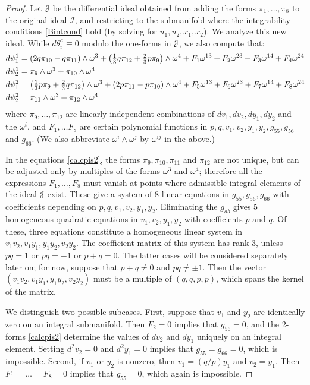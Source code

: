 \documentclass[12pt,reqno]{amsart}
\theoremstyle{definition}
\theoremstyle{remark}
\begin{document}
\begin{proof}
Let ${{\EuScript J}}$ be the differential ideal obtained from adding the forms $\pi_1, \dots, \pi_8$
to the original ideal ${{\mathcal I}}$, and restricting to the submanifold where the integrability
conditions \eqref{Bintcond} hold (by solving for $u_1, u_2, x_1, x_2$).  We analyze this new ideal.
While $d\theta^a_i\equiv 0$ modulo the one-forms in ${{\EuScript J}}$, we also compute that:
\begin{align} \label{calcpis2}
d\psi^1_1&=(2q\pi_{10}-q\pi_{11})\wedge \omega^3+\left(\tfrac{1}{3}q\pi_{12}
+\tfrac{2}{3}p\pi_9\right)\wedge\omega^4+F_1\omega^{13}+F_2\omega^{23}+F_3\omega^{14}+F_4\omega^{24}\notag\\
d\psi^1_2&=\pi_{9}\wedge \omega^3+\pi_{10}\wedge \omega^4\\
d\psi^2_1&=\left(\tfrac{1}{3}p\pi_9+\tfrac{2}{3}q\pi_{12}\right)\wedge \omega^3+(2p\pi_{11}-p\pi_{10})\wedge \omega^4
+F_5\omega^{13}+F_6\omega^{23}+F_7\omega^{14}+F_8\omega^{24}\notag\\
d\psi^2_2&=\pi_{11}\wedge \omega^3+\pi_{12}\wedge \omega^4\notag
\end{align}
where $\pi_9, \ldots, \pi_{12}$ are
linearly independent combinations of
$dv_1, dv_2, dy_1, dy_2$ and the ${\omega}^i$, and $F_1, \dots F_8$ are certain polynomial functions in $p,q, v_1, v_2, y_1,y_2, g_{55}, g_{56}$ and $g_{66}$.
(We also abbreviate $\omega^i\wedge \omega^j$ by $\omega^{ij}$ in the above.)

In the equations \eqref{calcpis2}, the forms $\pi_9, \pi_{10}, \pi_{11}$ and $\pi_{12}$
are not unique, but can be adjusted only by multiples of the forms $\omega^3$ and $\omega^4$;
therefore all the expressions $F_1, \dots, F_8$ must vanish at points where admissible integral elements
of the ideal ${{\EuScript J}}$ exist. These give a system of 8 linear equations in $g_{55}, g_{56}, g_{66}$
with coefficients depending on $p,q, v_1, v_2, y_1,y_2$.
Eliminating the $g_{ab}$ gives 5 homogeneous quadratic equations in $v_1, v_2, y_1, y_2$
with coefficients $p$ and $q$.  Of these, three equations constitute a homogeneous linear system in $v_1v_2, v_1y_1, y_1y_2, v_2y_2$.
The coefficient matrix of this system has rank 3, unless $pq=1$ or $pq=-1$ or $p+q=0$.
The latter cases will be considered separately later on; for now, suppose that $p+q\not =0$ and $pq\not = \pm 1$.
Then the vector $(v_1v_2, v_1y_1, y_1y_2, v_2y_2)$ must be a multiple
of $(q,q,p,p)$, which spans the kernel of the matrix.

We distinguish two possible subcases.  First,
suppose that $v_1$ and $y_2$ are identically zero on an integral submanifold.
Then $F_2=0$ implies that $g_{56}=0$, and the 2-forms \eqref{calcpis2} determine
the values of $dv_2$ and $dy_1$ uniquely on an integral element.
Setting $d^2 v_2=0$ and $d^2 y_1=0$ implies that $g_{55}=g_{66}=0$, which is impossible.
Second, if $v_1$ or $y_2$ is nonzero, then $v_1 = (q/p) y_1$ and $v_2=y_1$.
Then $F_1=\ldots=F_8=0$ implies that $g_{55}=0$, which again is impossible.


\end{proof}
\end{document}
